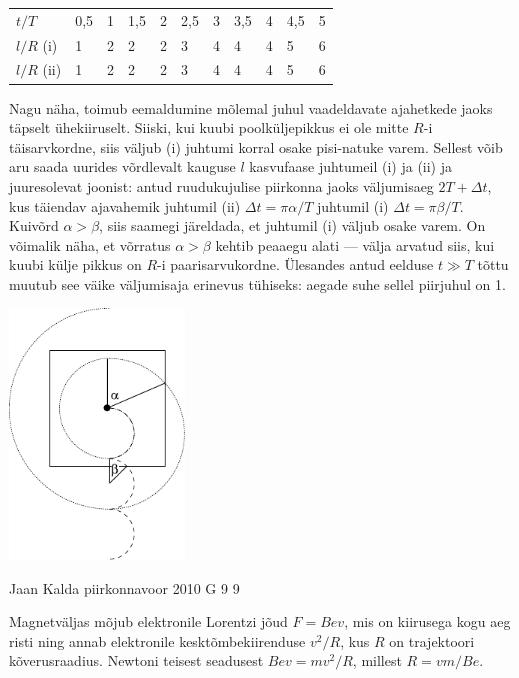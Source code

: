 \documentclass[11pt]{article}
\begin{document}
{{\begin{tabular}{lllllllllll}
	$t/T$ & 0,5 & 1 & 1,5 & 2 & 2,5 & 3 & 3,5 & 4 & 4,5 & 5 \\
	$l/R$ (i) & 1 & 2 & 2 & 2 & 3 & 4 & 4 & 4 & 5 & 6 \\
	$l/R$ (ii) & 1 & 2 & 2 & 2 & 3 & 4 & 4 & 4 & 5 & 6
\end{tabular}

Nagu näha, toimub eemaldumine mõlemal juhul vaadeldavate ajahetkede jaoks täpselt ühekiiruselt. Siiski, kui kuubi poolküljepikkus ei ole 
mitte $R$-i täisarvkordne, siis väljub (i) juhtumi korral osake pisi-natuke varem. Sellest võib aru saada uurides võrdlevalt 
kauguse $l$ kasvufaase juhtumeil (i) ja (ii) ja juuresolevat joonist: antud ruudukujulise piirkonna jaoks väljumisaeg $2T+\Delta t$, kus
täiendav ajavahemik juhtumil (ii) $\Delta t=\pi \alpha/T$ juhtumil (i) $\Delta t=\pi \beta/T$.
Kuivõrd $\alpha > \beta$, siis saamegi järeldada, et juhtumil (i) väljub osake varem. On võimalik näha, et võrratus 
$\alpha > \beta$ kehtib peaaegu alati --- välja arvatud siis, kui kuubi külje pikkus on $R$-i paarisarvukordne.
Ülesandes antud eelduse $t\gg T$ tõttu muutub see väike väljumisaja erinevus tühiseks: aegade suhe sellel piirjuhul on 1.
\begin{center}
	\includegraphics[width=0.35\textwidth]{2010-lahg-08-lah}
\end{center}
\fi
}

{Jaan Kalda} %
{piirkonnavoor} %
{2010} %
{G 9} %
{9} %
{

\ifSolution
Magnetväljas mõjub elektronile Lorentzi jõud $F=Bev$, mis on kiirusega kogu aeg risti ning
annab elektronile kesktõmbekiirenduse $v^2/R$, kus $R$ on trajektoori kõverusraadius. Newtoni teisest seadusest $Bev=mv^2/R$, millest $R=vm/Be$.

}}
\end{document}
